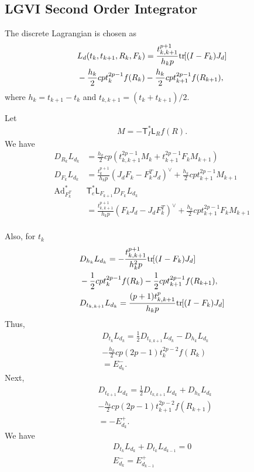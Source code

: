 \documentclass[letterpaper, 10pt, conference]{ieeeconf}
\newcommand{\bracket}[1]{\ensuremath{\left[ #1 \right]}}
\newcommand{\tr}[1]{\mbox{tr}\ensuremath{\negthickspace\bracket{#1}}}
\newcommand{\T}{\ensuremath{\mathsf{T}}}
\renewcommand{\L}{\ensuremath{\mathsf{L}}}
\newcommand{\Ad}{\ensuremath{\mathrm{Ad}}}
\begin{document}
\subsection{LGVI Second Order Integrator}


The discrete Lagrangian is chosen as
\begin{align*}
    & L_d(t_k, t_{k+1}, R_k, F_k) = \frac{t_{k,k+1}^{p+1}}{h_k p} \tr{(I-F_k)J_d}\\
    &- \frac{h_k}{2}c p t_k^{2p-1} f(R_k) - \frac{h_k}{2}c p t_{k+1}^{2p-1} f(R_{k+1}),
\end{align*}
where $h_k = t_{k+1}-t_k$ and $t_{k,k+1}=(t_k + t_{k+1})/2$.

Let 
\begin{align*}
    M = -\T^*_I \L_R f(R).
\end{align*}
We have
\begin{align*}
    D_{R_k} L_{d_k} &= \frac{h_k}{2} cp (t_{k,k+1}^{2p-1} M_k + t_{k+1}^{2p-1} F_k M_{k+1})\\
    D_{F_k} L_{d_k} &= \frac{t^{p+1}_{k}}{h_k p} (J_dF_k -F_k^T J_d)^\vee + \frac{h_k}{2} cpt^{2p-1}_{k+1} M_{k+1} \\
    \Ad^*_{F_k^T} & \T^*_e \L_{F_{k+1}} D_{F_k} L_{d_k}\\
                    & = \frac{t^{p+1}_{k,k+1}}{h_k p} (F_k J_d - J_dF_k^T)^\vee + \frac{h_k}{2} cpt^{2p-1}_{k+1} F_k M_{k+1} \\
\end{align*}

Also, for $t_k$
\begin{align*}
    & D_{h_k} L_{d_k} = -\frac{t^{p+1}_{k,k+1}}{h_k^2 p} \tr{(I-F_k)J_d}\\
    & - \frac{1}{2}c p t_k^{2p-1} f(R_k) - \frac{1}{2}c p t_{k+1}^{2p-1} f(R_{k+1}),\\
    & D_{t_{k,k+1}} L_{d_k} = \frac{(p+1)t_{k,k+1}^p}{h_k p} \tr{(I-F_k)J_d}  
\end{align*}
Thus,
\begin{align*}
    & D_{t_k} L_{d_k} = \frac{1}{2} D_{t_{k,k+1}} L_{d_k} - D_{h_k} L_{d_k} \\
    & -\frac{h_k}{2} c p (2p-1) t_k^{2p-2} f(R_k) \\
    & = E^-_{d_k}.
\end{align*}
Next,
\begin{align*}
    & D_{t_{k+1}} L_{d_k} = \frac{1}{2} D_{t_{k,k+1}} L_{d_k} + D_{h_k} L_{d_k} \\
    & -\frac{h_k}{2} c p (2p-1) t_{k+1}^{2p-2} f(R_{k+1}) \\
    & = - E^+_{d_k}.
\end{align*}
We have
\begin{gather*}
    D_{t_k} L_{d_k} + D_{t_k} L_{d_{k-1}} = 0\\
    E^-_{d_k} = E^+_{d_{k-1}} \\
\end{gather*}
\end{document}

